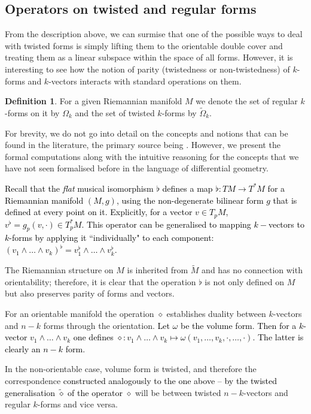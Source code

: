 \documentclass[11pt,twoside]{article}
\theoremstyle{definition}
\newtheorem{Def}[theorem]{Definition}
\numberwithin{equation}{section}
\def\Mt{\widetilde{M}}
\begin{document}
\subsection{Operators on twisted and regular forms}
From the description above, we can surmise that one of the possible ways to deal with twisted forms is simply lifting them to the orientable double cover and treating them as a linear subspace within the space of all forms. However, it is interesting to see how the notion of parity (twistedness or non-twistedness) of $k$-forms and $k$-vectors interacts with standard operations on them.  

\begin{Def}
    For a given Riemannian manifold $M$ we denote the set of regular $k$-forms on it by $\Omega_k$ and the set of twisted $k$-forms by $\widetilde{\Omega}_k$. 
\end{Def}

For brevity, we do not go into detail on the concepts and notions that can be found in the literature, the primary source being \cite{bott2013differential}. However, we present the formal computations along with the intuitive reasoning for the concepts that we have not seen formalised before in the language of differential geometry. 
 
 \textcolor{black}{Recall that the \textit{flat} musical isomorphism $\flat $ defines a map $\flat:TM\to T^{\ast}M$ for a Riemannian manifold $(M,g)$,  using the non-degenerate bilinear form $g$ that is defined at every point on it. Explicitly, for a vector $v\in T_p M$, $v^{\flat} = g_p(v,\cdot)\in T^{\ast}_pM$. This operator can be generalised to mapping $k-$vectors to $k$-forms by applying it ``individually" to each component: $\left(v_1\wedge\ldots\wedge v_k\right)^{\flat} = v_1^{\flat}\wedge\ldots\wedge v_k^{\flat}$.}  

 The Riemannian structure on $M$ is inherited from $\Mt$ and has no connection with orientability; therefore, it is clear that the operation $\flat$ is not only defined on $M$ but also preserves parity of  forms and vectors. 

 For an orientable manifold the operation $\diamond$ establishes duality between $k$-vectors and $n-k$ forms through the orientation.
 \textcolor{black}{Let $\omega$ be the volume form. Then for a $k$-vector $v_1\wedge\ldots\wedge v_k$  one defines  $\diamond:v_1\wedge\ldots\wedge v_k\mapsto \omega(v_1,\ldots,v_k,\cdot, \ldots, \cdot)$. The latter is clearly an $n-k$ form. }
 
 In the non-orientable case, volume form is twisted, and therefore the correspondence \textcolor{black}{constructed analogously to the one above -- by the twisted generalisation $\widetilde{\diamond}$ of the operator} $\diamond $ will be between twisted $n-k$-vectors and regular $k$-forms and vice versa. 
\end{document}
